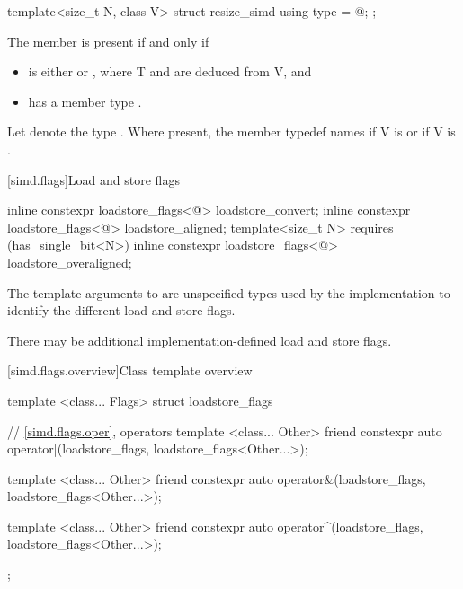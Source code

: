\begin{itemdecl}
template<size_t N, class V> struct resize_simd { using type = @\seebelow@; };
\end{itemdecl}

\begin{itemdescr}
  \pnum
  The member  is present if and only if
  \begin{itemize}
    \item {} is either  or , where \tcode T and  are deduced from \tcode V, and
    \item {} has a member type .
  \end{itemize}

  \pnum
  Let  denote the type .
  Where present, the member typedef  names  if \tcode V is  or  if \tcode V is .
\end{itemdescr}

[simd.flags]{Load and store flags}

\begin{itemdecl}
inline constexpr loadstore_flags<@\seebelow@> loadstore_convert{};
inline constexpr loadstore_flags<@\seebelow@> loadstore_aligned{};
template<size_t N> requires (has_single_bit<N>)
  inline constexpr loadstore_flags<@\seebelow@> loadstore_overaligned{};
\end{itemdecl}

\begin{itemdescr}
  \pnum
  The template arguments to  are unspecified types used
  by the implementation to identify the different load and store flags.

  \pnum
  There may be additional implementation-defined load and store flags.
\end{itemdescr}

[simd.flags.overview]{Class template  overview}

\begin{codeblock}
template <class... Flags> struct loadstore_flags {
  // \ref{simd.flags.oper},  operators
  template <class... Other>
    friend constexpr auto operator|(loadstore_flags, loadstore_flags<Other...>);

  template <class... Other>
    friend constexpr auto operator&(loadstore_flags, loadstore_flags<Other...>);

  template <class... Other>
    friend constexpr auto operator^(loadstore_flags, loadstore_flags<Other...>);
};
\end{codeblock}

